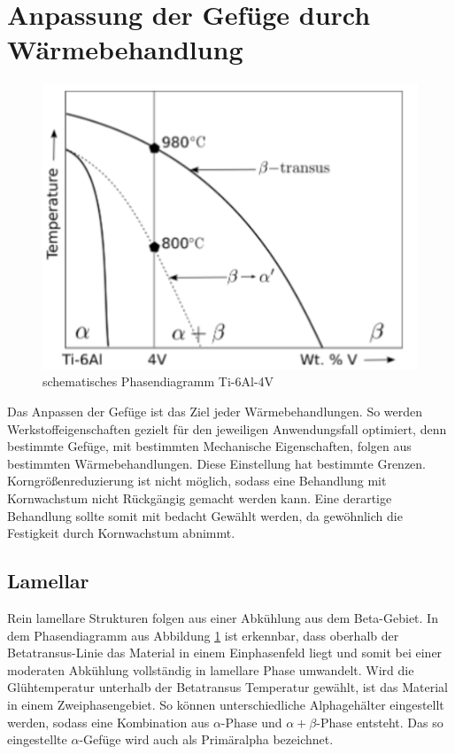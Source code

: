 \documentclass[a4paper, 11pt]{tubsreprt}
\begin{document}
\section{Anpassung der Gefüge durch Wärmebehandlung}
\begin{figure}
	\centering
	\includegraphics[scale=0.9]{Bilder/Phasendiagram.PNG}
	\caption[Phasendiagramm]{schematisches Phasendiagramm Ti-6Al-4V \cite{Babu2008}}
	\label{Phasendiagram}
\end{figure}
Das Anpassen der Gefüge ist das Ziel jeder Wärmebehandlungen. So werden Werkstoffeigenschaften gezielt für den jeweiligen Anwendungsfall optimiert, denn bestimmte Gefüge, mit bestimmten Mechanische Eigenschaften, folgen aus bestimmten Wärmebehandlungen. Diese Einstellung hat bestimmte Grenzen. Korngrößenreduzierung ist nicht möglich, sodass eine Behandlung mit Kornwachstum nicht Rückgängig gemacht werden kann. Eine derartige Behandlung sollte somit mit bedacht Gewählt werden, da gewöhnlich die Festigkeit durch Kornwachstum abnimmt.
\subsection{Lamellar}
Rein lamellare Strukturen folgen aus einer Abkühlung aus dem Beta-Gebiet. In dem Phasendiagramm aus Abbildung \ref{Phasendiagram} ist erkennbar, dass oberhalb der Betatransus-Linie das Material in einem Einphasenfeld liegt und somit bei einer moderaten Abkühlung vollständig in lamellare Phase umwandelt. Wird die Glühtemperatur unterhalb der Betatransus Temperatur gewählt, ist das Material in einem Zweiphasengebiet. So können unterschiedliche Alphagehälter eingestellt werden, sodass eine Kombination aus $\alpha$-Phase und $\alpha + \beta$-Phase entsteht. Das so eingestellte $\alpha$-Gefüge wird auch als Primäralpha bezeichnet. 
\end{document}
